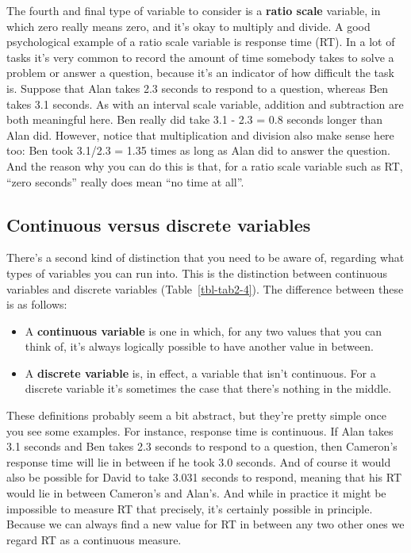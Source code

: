\documentclass[
  a4paper,
]{book}
\providecommand{\tightlist}{%
  \setlength{\itemsep}{0pt}\setlength{\parskip}{0pt}}\usepackage{longtable,booktabs,array}
\begin{document}
The fourth and final type of variable to consider is a \textbf{ratio
scale} variable, in which zero really means zero, and it's okay to
multiply and divide. A good psychological example of a ratio scale
variable is response time (RT). In a lot of tasks it's very common to
record the amount of time somebody takes to solve a problem or answer a
question, because it's an indicator of how difficult the task is.
Suppose that Alan takes 2.3 seconds to respond to a question, whereas
Ben takes 3.1 seconds. As with an interval scale variable, addition and
subtraction are both meaningful here. Ben really did take 3.1 - 2.3 =
0.8 seconds longer than Alan did. However, notice that multiplication
and division also make sense here too: Ben took 3.1/2.3 = 1.35 times as
long as Alan did to answer the question. And the reason why you can do
this is that, for a ratio scale variable such as RT, ``zero seconds''
really does mean ``no time at all''.

\hypertarget{continuous-versus-discrete-variables}{%
\subsection{Continuous versus discrete
variables}\label{continuous-versus-discrete-variables}}

There's a second kind of distinction that you need to be aware of,
regarding what types of variables you can run into. This is the
distinction between continuous variables and discrete variables
(Table~\ref{tbl-tab2-4}). The difference between these is as follows:

\begin{itemize}
\tightlist
\item
  A \textbf{continuous variable} is one in which, for any two values
  that you can think of, it's always logically possible to have another
  value in between.
\item
  A \textbf{discrete variable} is, in effect, a variable that isn't
  continuous. For a discrete variable it's sometimes the case that
  there's nothing in the middle.
\end{itemize}

These definitions probably seem a bit abstract, but they're pretty
simple once you see some examples. For instance, response time is
continuous. If Alan takes 3.1 seconds and Ben takes 2.3 seconds to
respond to a question, then Cameron's response time will lie in between
if he took 3.0 seconds. And of course it would also be possible for
David to take 3.031 seconds to respond, meaning that his RT would lie in
between Cameron's and Alan's. And while in practice it might be
impossible to measure RT that precisely, it's certainly possible in
principle. Because we can always find a new value for RT in between any
two other ones we regard RT as a continuous measure.
\end{document}
